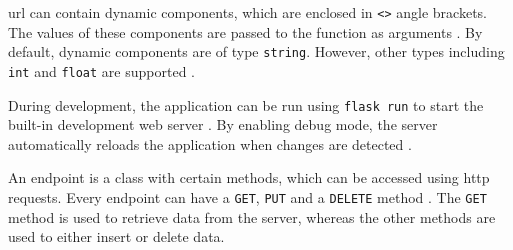 \acs{url} can contain dynamic components, which are enclosed in \texttt{<>} angle brackets.
The values of these components are passed to the function as arguments \cite{flask_book2018}.
By default, dynamic components are of type \texttt{string}.
However, other types including \texttt{int} and \texttt{float} are supported \cite{flask_book2018}.

During development, the \flask{} application can be run using \texttt{flask run} to start the built-in development web server \cite{flask_book2018}.
By enabling debug mode, the server automatically reloads the application when changes are detected \cite{flask_book2018}.

An endpoint is a class with certain methods, which can be accessed using \ac{http} requests.
Every endpoint can have a \texttt{GET}, \texttt{PUT} and a \texttt{DELETE} method \cite{flask2018}.
The \texttt{GET} method is used to retrieve data from the server, whereas the other methods are used to either insert or delete data.
